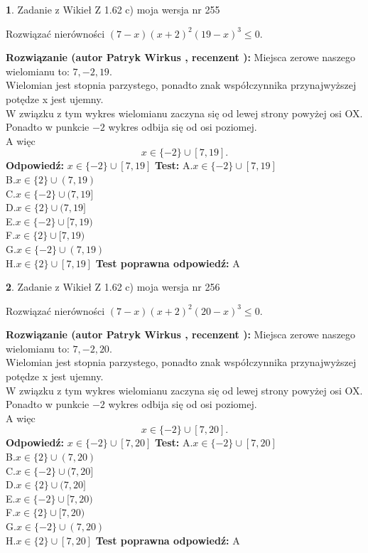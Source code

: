 \documentclass[12pt, a4paper]{article}
\theoremstyle{definition} %
\newtheorem{zad}{}
\newcommand{\zadStart}[1]{\begin{zad}#1\newline}
\newcommand{\zadStop}{\end{zad}}
\newcommand{\rozwStart}[2]{\noindent \textbf{Rozwiązanie (autor #1 , recenzent #2): }\newline}
\newcommand{\rozwStop}{\newline}
\newcommand{\odpStart}{\noindent \textbf{Odpowiedź:}\newline}
\newcommand{\odpStop}{\newline}
\newcommand{\testStart}{\noindent \textbf{Test:}\newline}
\newcommand{\testStop}{\newline}
\newcommand{\kluczStart}{\noindent \textbf{Test poprawna odpowiedź:}\newline}
\newcommand{\kluczStop}{\newline}
\begin{document}
\zadStart{Zadanie z Wikieł Z 1.62 c) moja wersja nr 255}

Rozwiązać nierówności $(7-x)(x+2)^{2}(19-x)^{3}\le0$.
\zadStop
\rozwStart{Patryk Wirkus}{}
Miejsca zerowe naszego wielomianu to: $7, -2, 19$.\\
Wielomian jest stopnia parzystego, ponadto znak współczynnika przy\linebreak najwyższej potędze x jest ujemny.\\ W związku z tym wykres wielomianu zaczyna się od lewej strony powyżej osi OX.\\
Ponadto w punkcie $-2$ wykres odbija się od osi poziomej.\\
A więc $$x \in \{-2\} \cup [7,19].$$
\rozwStop
\odpStart
$x \in \{-2\} \cup [7,19]$
\odpStop
\testStart
A.$x \in \{-2\} \cup [7,19]$\\
B.$x \in \{2\} \cup (7,19)$\\
C.$x \in \{-2\} \cup (7,19]$\\
D.$x \in \{2\} \cup (7,19]$\\
E.$x \in \{-2\} \cup [7,19)$\\
F.$x \in \{2\} \cup [7,19)$\\
G.$x \in \{-2\} \cup (7,19)$\\
H.$x \in \{2\} \cup [7,19]$
\testStop
\kluczStart
A
\kluczStop



\zadStart{Zadanie z Wikieł Z 1.62 c) moja wersja nr 256}

Rozwiązać nierówności $(7-x)(x+2)^{2}(20-x)^{3}\le0$.
\zadStop
\rozwStart{Patryk Wirkus}{}
Miejsca zerowe naszego wielomianu to: $7, -2, 20$.\\
Wielomian jest stopnia parzystego, ponadto znak współczynnika przy\linebreak najwyższej potędze x jest ujemny.\\ W związku z tym wykres wielomianu zaczyna się od lewej strony powyżej osi OX.\\
Ponadto w punkcie $-2$ wykres odbija się od osi poziomej.\\
A więc $$x \in \{-2\} \cup [7,20].$$
\rozwStop
\odpStart
$x \in \{-2\} \cup [7,20]$
\odpStop
\testStart
A.$x \in \{-2\} \cup [7,20]$\\
B.$x \in \{2\} \cup (7,20)$\\
C.$x \in \{-2\} \cup (7,20]$\\
D.$x \in \{2\} \cup (7,20]$\\
E.$x \in \{-2\} \cup [7,20)$\\
F.$x \in \{2\} \cup [7,20)$\\
G.$x \in \{-2\} \cup (7,20)$\\
H.$x \in \{2\} \cup [7,20]$
\testStop
\kluczStart
A
\kluczStop
\end{document}
